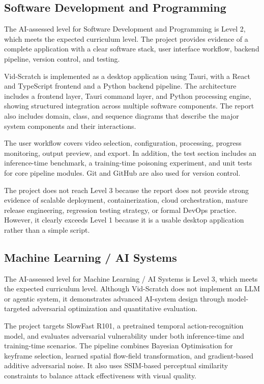 \subsection{Software Development and Programming}
\label{subsection:software-development-evaluation}

The AI-assessed level for Software Development and Programming is
Level 2, which meets the expected curriculum level. The project
provides evidence of a complete application with a clear software
stack, user interface workflow, backend pipeline, version control, and
testing.

Vid-Scratch is implemented as a desktop application using Tauri, with
a React and TypeScript frontend and a Python backend pipeline. The
architecture includes a frontend layer, Tauri command layer, and Python
processing engine, showing structured integration across multiple
software components. The report also includes domain, class, and
sequence diagrams that describe the major system components and their
interactions.

The user workflow covers video selection, configuration, processing,
progress monitoring, output preview, and export. In addition, the test
section includes an inference-time benchmark, a training-time poisoning
experiment, and unit tests for core pipeline modules. Git and GitHub
are also used for version control.

The project does not reach Level 3 because the report does not provide
strong evidence of scalable deployment, containerization, cloud
orchestration, mature release engineering, regression testing strategy,
or formal DevOps practice. However, it clearly exceeds Level 1 because
it is a usable desktop application rather than a simple script.

\subsection{Machine Learning / AI Systems}
\label{subsection:ml-ai-evaluation}

The AI-assessed level for Machine Learning / AI Systems is Level 3,
which meets the expected curriculum level. Although Vid-Scratch does
not implement an LLM or agentic system, it demonstrates advanced
AI-system design through model-targeted adversarial optimization and
quantitative evaluation.

The project targets SlowFast R101, a pretrained temporal
action-recognition model, and evaluates adversarial vulnerability under
both inference-time and training-time scenarios. The pipeline combines
Bayesian Optimisation for keyframe selection, learned spatial
flow-field transformation, and gradient-based additive adversarial
noise. It also uses SSIM-based perceptual similarity constraints to
balance attack effectiveness with visual quality.

